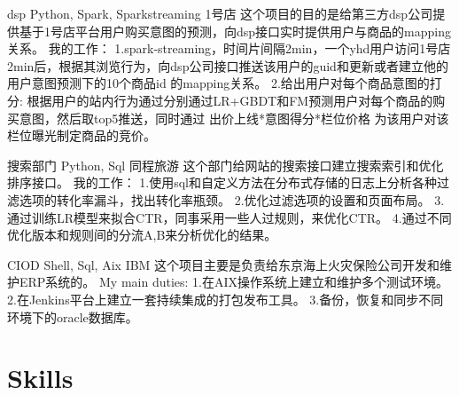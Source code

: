 \documentclass[11pt,a4paper]{moderncv}
\begin{document}
{dsp}
{Python, Spark, Sparkstreaming}{}
{1号店}
{
这个项目的目的是给第三方dsp公司提供基于1号店平台用户购买意图的预测，向dsp接口实时提供用户与商品的mapping关系。
\newline  我的工作：
\newline 1.spark-streaming，时间片间隔2min，一个yhd用户访问1号店2min后，根据其浏览行为，向dsp公司接口推送该用户的guid和更新或者建立他的用户意图预测下的10个商品id 的mapping关系。
\newline 2.给出用户对每个商品意图的打分: 根据用户的站内行为通过分别通过LR+GBDT和FM预测用户对每个商品的购 买意图，然后取top5推送，同时通过 出价上线*意图得分*栏位价格 为该用户对该栏位曝光制定商品的竞价。
\newline
}

{搜索部门}
{Python, Sql}{}
{同程旅游}
{
这个部门给网站的搜索接口建立搜索索引和优化排序接口。
\newline 我的工作：
\newline 1.使用sql和自定义方法在分布式存储的日志上分析各种过滤选项的转化率漏斗，找出转化率瓶颈。
\newline 2.优化过滤选项的设置和页面布局。
\newline 3.通过训练LR模型来拟合CTR，同事采用一些人过规则，来优化CTR。
\newline 4.通过不同优化版本和规则间的分流A,B来分析优化的结果。
\newline
}

{CIOD}
{Shell, Sql, Aix}{}
{IBM}
{
这个项目主要是负责给东京海上火灾保险公司开发和维护ERP系统的。
\newline My main duties:
\newline 1.在AIX操作系统上建立和维护多个测试环境。
\newline 2.在Jenkins平台上建立一套持续集成的打包发布工具。
\newline 3.备份，恢复和同步不同环境下的oracle数据库。
\newline
}

\section{Skills}
\closesection{}                   %
\renewcommand{\listitemsymbol}{-} %
\end{document}
